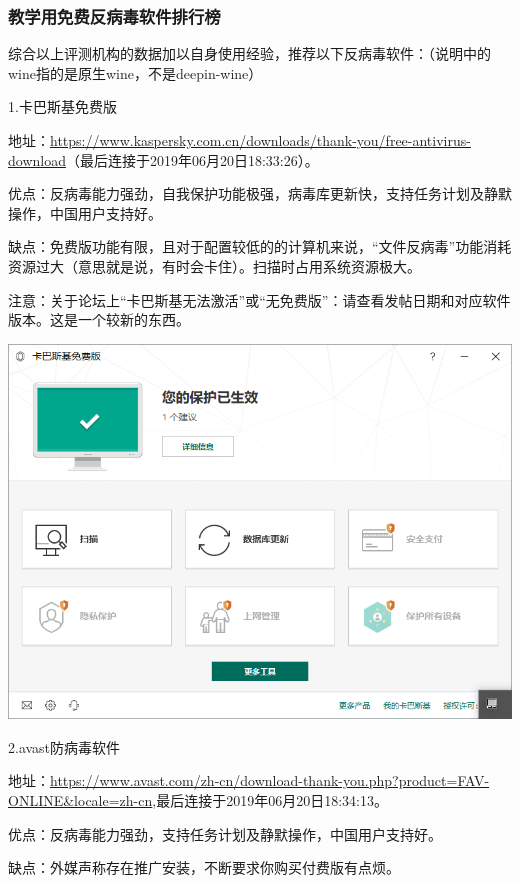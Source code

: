 \subsubsection{教学用免费反病毒软件排行榜}
综合以上评测机构的数据加以自身使用经验，推荐以下反病毒软件：（说明中的wine指的是原生wine，不是deepin-wine）\par
1.卡巴斯基免费版\par
地址：\url{https://www.kaspersky.com.cn/downloads/thank-you/free-antivirus-download}（最后连接于2019年06月20日18:33:26）。\par
优点：反病毒能力强劲，自我保护功能极强，病毒库更新快，支持任务计划及静默操作，中国用户支持好。\par
缺点：免费版功能有限，且对于配置较低的的计算机来说，“文件反病毒”功能消耗资源过大（意思就是说，有时会卡住）。扫描时占用系统资源极大。\par
注意：关于论坛上“卡巴斯基无法激活”或“无免费版”：请查看发帖日期和对应软件版本。这是一个较新的东西。
\begin{center}
	\includegraphics[scale=0.6]{pic/kfa}
\end{center} \par
2.avast防病毒软件\par
地址：\url{https://www.avast.com/zh-cn/download-thank-you.php?product=FAV-ONLINE\&locale=zh-cn},最后连接于2019年06月20日18:34:13。\par
优点：反病毒能力强劲，支持任务计划及静默操作，中国用户支持好。\par
缺点：外媒声称存在推广安装，不断要求你购买付费版有点烦。
